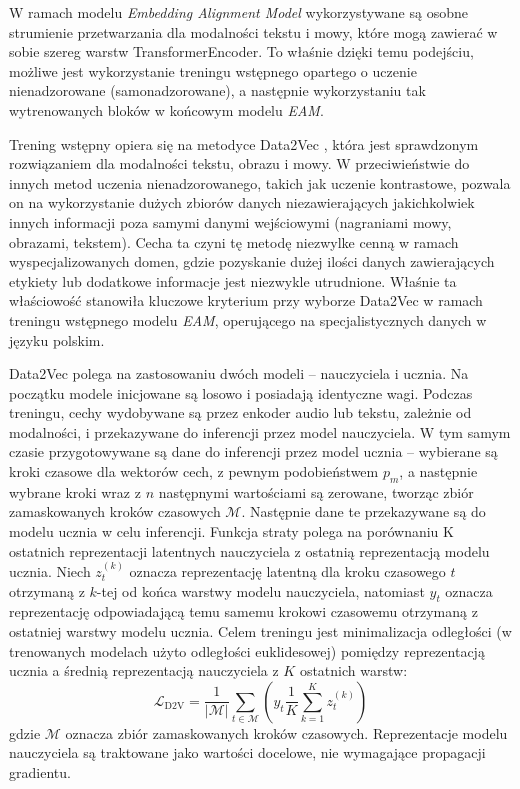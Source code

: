 W ramach modelu \textit{Embedding Alignment Model} wykorzystywane są osobne strumienie przetwarzania dla modalności tekstu i mowy, które mogą zawierać w sobie szereg warstw TransformerEncoder. To właśnie dzięki temu podejściu, możliwe jest wykorzystanie treningu wstępnego opartego o uczenie nienadzorowane (samonadzorowane), a następnie wykorzystaniu tak wytrenowanych bloków w końcowym modelu \textit{EAM}.

Trening wstępny opiera się na metodyce Data2Vec \cite{data2vec}, która jest sprawdzonym rozwiązaniem dla modalności tekstu, obrazu i mowy. W przeciwieństwie do innych metod uczenia nienadzorowanego, takich jak uczenie kontrastowe, pozwala on na wykorzystanie dużych zbiorów danych niezawierających jakichkolwiek innych informacji poza samymi danymi wejściowymi (nagraniami mowy, obrazami, tekstem). Cecha ta czyni tę metodę niezwylke cenną w ramach wyspecjalizowanych domen, gdzie pozyskanie dużej ilości danych zawierających etykiety lub dodatkowe informacje jest niezwykle utrudnione. Właśnie ta właściowość stanowiła kluczowe kryterium przy wyborze Data2Vec w ramach treningu wstępnego modelu \textit{EAM}, operującego na specjalistycznych danych w języku polskim.

Data2Vec polega na zastosowaniu dwóch modeli -- nauczyciela i ucznia. Na początku modele inicjowane są losowo i posiadają identyczne wagi. Podczas treningu, cechy wydobywane są przez enkoder audio lub tekstu, zależnie od modalności, i przekazywane do inferencji przez model nauczyciela. W tym samym czasie przygotowywane są dane do inferencji przez model ucznia -- wybierane są kroki czasowe dla wektorów cech, z pewnym podobieństwem $p_m$, a następnie wybrane kroki wraz z $n$ następnymi wartościami są zerowane, tworząc zbiór zamaskowanych kroków czasowych $\mathcal{M}$. Następnie dane te przekazywane są do modelu ucznia w celu inferencji. Funkcja straty polega na porównaniu K ostatnich reprezentacji latentnych nauczyciela z ostatnią reprezentacją modelu ucznia. Niech $z_{t}^{(k)}$ oznacza reprezentację latentną dla kroku czasowego $t$ otrzymaną z $k$-tej od końca warstwy modelu nauczyciela, natomiast $y_{t}$ oznacza reprezentację odpowiadającą temu samemu krokowi czasowemu otrzymaną z ostatniej warstwy modelu ucznia. Celem treningu jest minimalizacja odległości (w trenowanych modelach użyto odległości euklidesowej) pomiędzy reprezentacją ucznia a średnią reprezentacją nauczyciela z $K$ ostatnich warstw:
\begin{equation}
    \mathcal{L}_\mathrm{D2V} = \frac{1}{|\mathcal{M}|} \sum_{t \in \mathcal{M}} (y_{t} \frac{1}{K} \sum_{k=1}^{K} z_{t}^{(k)})
    \label{eq:data2vecLoss}
\end{equation}
gdzie $\mathcal{M}$ oznacza zbiór zamaskowanych kroków czasowych. Reprezentacje modelu nauczyciela są traktowane jako wartości docelowe, nie wymagające propagacji gradientu.

